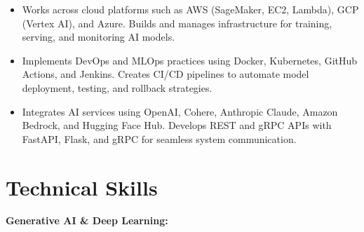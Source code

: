 \documentclass[11pt,letterpaper]{article}
\begin{document}
\begin{itemize}
  \item Works across cloud platforms such as AWS (SageMaker, EC2, Lambda), GCP (Vertex AI), and
        Azure. Builds and manages infrastructure for training, serving, and monitoring AI models.

  \item Implements DevOps and MLOps practices using Docker, Kubernetes, GitHub Actions, and Jenkins.
        Creates CI/CD pipelines to automate model deployment, testing, and rollback strategies.

  \item Integrates AI services using OpenAI, Cohere, Anthropic Claude, Amazon Bedrock, and Hugging
        Face Hub. Develops REST and gRPC APIs with FastAPI, Flask, and gRPC for seamless system
        communication.
\end{itemize}

\vspace{-20pt}
\section*{Technical Skills}
\vspace{-20pt}

\noindent\textbf{Generative AI \& Deep Learning:}
\end{document}
